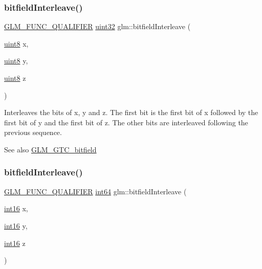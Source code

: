 \subsubsection{\texorpdfstring{bitfield\+Interleave()}{bitfieldInterleave()}\hspace{0.1cm}{\footnotesize\ttfamily [8/16]}}
{\footnotesize\ttfamily \mbox{\hyperlink{setup_8hpp_a33fdea6f91c5f834105f7415e2a64407}{G\+L\+M\+\_\+\+F\+U\+N\+C\+\_\+\+Q\+U\+A\+L\+I\+F\+I\+ER}} \mbox{\hyperlink{group__gtc__type__precision_ga202b6a53c105fcb7e531f9b443518451}{uint32}} glm\+::bitfield\+Interleave (\begin{DoxyParamCaption}\item[{\mbox{\hyperlink{group__gtc__type__precision_ga1a7dcd8aac97cc8020817c94049deff2}{uint8}}}]{x,  }\item[{\mbox{\hyperlink{group__gtc__type__precision_ga1a7dcd8aac97cc8020817c94049deff2}{uint8}}}]{y,  }\item[{\mbox{\hyperlink{group__gtc__type__precision_ga1a7dcd8aac97cc8020817c94049deff2}{uint8}}}]{z }\end{DoxyParamCaption})}

Interleaves the bits of x, y and z. The first bit is the first bit of x followed by the first bit of y and the first bit of z. The other bits are interleaved following the previous sequence.

\begin{DoxySeeAlso}{See also}
\mbox{\hyperlink{group__gtc__bitfield}{G\+L\+M\+\_\+\+G\+T\+C\+\_\+bitfield}} 
\end{DoxySeeAlso}
\mbox{\label{group__gtc__bitfield_gaf898f842ac089fcc8d6201c32702584a}} 
\subsubsection{\texorpdfstring{bitfield\+Interleave()}{bitfieldInterleave()}\hspace{0.1cm}{\footnotesize\ttfamily [9/16]}}
{\footnotesize\ttfamily \mbox{\hyperlink{setup_8hpp_a33fdea6f91c5f834105f7415e2a64407}{G\+L\+M\+\_\+\+F\+U\+N\+C\+\_\+\+Q\+U\+A\+L\+I\+F\+I\+ER}} \mbox{\hyperlink{group__gtc__type__precision_ga435d75819cce297cc5fa21bd84ef89a5}{int64}} glm\+::bitfield\+Interleave (\begin{DoxyParamCaption}\item[{\mbox{\hyperlink{group__gtc__type__precision_ga2945a61d12771f8954994fcddf02b021}{int16}}}]{x,  }\item[{\mbox{\hyperlink{group__gtc__type__precision_ga2945a61d12771f8954994fcddf02b021}{int16}}}]{y,  }\item[{\mbox{\hyperlink{group__gtc__type__precision_ga2945a61d12771f8954994fcddf02b021}{int16}}}]{z }\end{DoxyParamCaption})}

